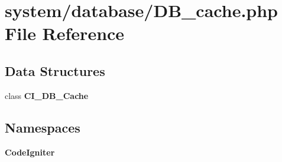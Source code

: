 \section{system/database/\-D\-B\-\_\-cache.php File Reference}
\label{_d_b__cache_8php}
\subsection*{Data Structures}
\begin{DoxyCompactItemize}
\item 
class {\bf C\-I\-\_\-\-D\-B\-\_\-\-Cache}
\end{DoxyCompactItemize}
\subsection*{Namespaces}
\begin{DoxyCompactItemize}
\item 
{\bf Code\-Igniter}
\end{DoxyCompactItemize}
